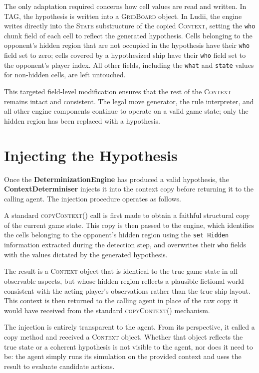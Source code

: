 The only adaptation required concerns how cell values are read and written. In TAG, the hypothesis is written into a \textsc{GridBoard} object. In Ludii, the engine writes directly into the \textsc{State} substructure of the copied \textsc{Context}, setting the \texttt{who} chunk field of each cell to reflect the generated hypothesis. Cells belonging to the opponent's hidden region that are not occupied in the hypothesis have their \texttt{who} field set to zero; cells covered by a hypothesized ship have their \texttt{who} field set to the opponent's player index. All other fields, including the \texttt{what} and \texttt{state} values for non-hidden cells, are left untouched.

This targeted field-level modification ensures that the rest of the \textsc{Context} remains intact and consistent. The legal move generator, the rule interpreter, and all other engine components continue to operate on a valid game state; only the hidden region has been replaced with a hypothesis.


\section{Injecting the Hypothesis}
\label{sec:injection}

Once the \textbf{DeterminizationEngine} has produced a valid hypothesis, the \textbf{ContextDeterminiser} injects it into the context copy before returning it to the calling agent. The injection procedure operates as follows.

A standard \textsc{copyContext()} call is first made to obtain a faithful structural copy of the current game state. This copy is then passed to the engine, which identifies the cells belonging to the opponent's hidden region using the \texttt{set Hidden} information extracted during the detection step, and overwrites their \texttt{who} fields with the values dictated by the generated hypothesis.

The result is a \textsc{Context} object that is identical to the true game state in all observable aspects, but whose hidden region reflects a plausible fictional world consistent with the acting player's observations rather than the true ship layout. This context is then returned to the calling agent in place of the raw copy it would have received from the standard \textsc{copyContext()} mechanism.

The injection is entirely transparent to the agent. From its perspective, it called a copy method and received a \textsc{Context} object. Whether that object reflects the true state or a coherent hypothesis is not visible to the agent, nor does it need to be: the agent simply runs its simulation on the provided context and uses the result to evaluate candidate actions.


